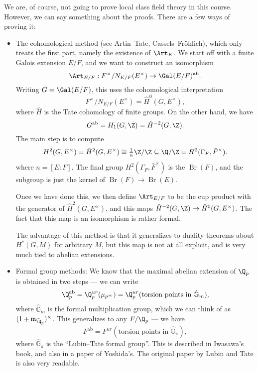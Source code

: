 \documentclass[a4paper]{article}
\DeclareMathOperator\Br{Br}
\renewcommand\G{\mathbb{G}}
\newcommand\ab{\mathrm{ab}}
\begin{document}
We are, of course, not going to prove local class field theory in this course. However, we can say something about the proofs. There are a few ways of proving it:
\begin{itemize}
  \item The cohomological method (see Artin--Tate, Cassels--Fr\"ohlich), which only treats the first part, namely the existence of $\Art_K$. We start off with a finite Galois extension $E/F$, and we want to construct an isomorphism
    \[
      \Art_{E/F}: F^\times/N_{E/F}(E^\times) \to \Gal(E/F)^{\ab}.
    \]
    Writing $G = \Gal(E/F)$, this uses the cohomological interpretation
    \[
      F^\times/N_{E/F}(E^\times) = \hat{H}^0(G, E^\times),
    \]
    where $\hat{H}$ is the Tate cohomology of finite groups. On the other hand, we have
    \[
      G^{\ab} = H_1(G, \Z) = \hat{H}^{-2}(G, \Z).
    \]
    The main step is to compute
    \[
      H^2(G, E^\times) = \hat{H}^2(G, E^\times) \cong \tfrac{1}{n}\Z/\Z \subseteq \Q/\Z = H^2(\Gamma_F, \bar{F}^\times).
    \]
    where $n = [E:F]$. The final group $H^2(\Gamma_F, \bar{F}^\times)$ is the  $\Br(F)$, and the subgroup is just the kernel of $\Br(F) \to \Br(E)$.

    Once we have done this, we then define $\Art_{E/F}$ to be the cup product with the generator of $\hat{H}^2(G, E^\times)$, and this maps $\hat{H}^{-2}(G, \Z) \to \hat{H}^0(G, E^\times)$. The fact that this map is an isomorphism is rather formal.

    The advantage of this method is that it generalizes to duality theorems about $H^*(G, M)$ for arbitrary $M$, but this map is not at all explicit, and is very much tied to abelian extensions.
  \item Formal group methods: We know that the maximal abelian extension of $\Q_p$ is obtained in two steps --- we can write
    \[
      \Q_p^{\ab} = \Q_p^{ur}(\mu_{p^\infty}) = \Q_p^{ur} (\text{torsion points in }\hat{\G}_m),
    \]
    where $\hat{\G}_m$ is the formal multiplication group, which we can think of as $(1 + \mathfrak{m}_{\bar{\Q}_p})^\times$. This generalizes to any $F/\Q_p$ --- we have
    \[
      F^{\ab} = F^{ur}(\text{torsion points in }\hat{\G}_\pi),
    \]
    where $\hat{\G}_\pi$ is the ``Lubin--Tate formal group''. This is described in Iwasawa's book, and also in a paper of Yoshida's. The original paper by Lubin and Tate is also very readable.


\end{itemize}
\end{document}

